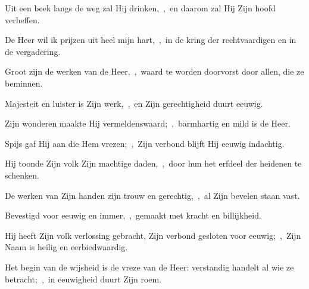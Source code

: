 \documentclass[12pt,twoside,a5paper]{article}
\begin{document}
\begin{halfparskip}
  Uit een beek langs de weg zal Hij drinken,~\sep\ en daarom zal Hij Zijn hoofd verheffen.

   De Heer wil ik prijzen uit heel mijn hart,~\sep\ in de kring der rechtvaardigen en in de vergadering.

  Groot zijn de werken van de Heer,~\sep\ waard te worden doorvorst door allen, die ze beminnen.

  Majesteit en luister is Zijn werk,~\sep\ en Zijn gerechtigheid duurt eeuwig.

  Zijn wonderen maakte Hij vermeldenswaard;~\sep\ barmhartig en mild is de Heer.

  Spijs gaf Hij aan die Hem vrezen;~\sep\ Zijn verbond blijft Hij eeuwig indachtig.

  Hij toonde Zijn volk Zijn machtige daden,~\sep\ door hun het erfdeel der heidenen te schenken.

  De werken van Zijn handen zijn trouw en gerechtig,~\sep\ al Zijn bevelen staan vast.

  Bevestigd voor eeuwig en immer,~\sep\ gemaakt met kracht en billijkheid.

  Hij heeft Zijn volk verlossing gebracht, Zijn verbond gesloten voor eeuwig;~\sep\ Zijn Naam is heilig en eerbiedwaardig.

  Het begin van de wijsheid is de vreze van de Heer: verstandig handelt al wie ze betracht;~\sep\ in eeuwigheid duurt Zijn roem.
\end{halfparskip}
\end{document}
